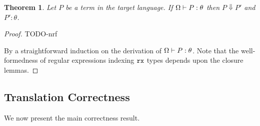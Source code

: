 \documentclass[10pt,preprint]{sigplanconf}
\newtheorem{thm}{Theorem}
\theoremstyle{definition}
\newcommand{\sreduces}{ \Downarrow }
\begin{document}
\begin{thm}
  Let $P$ be a term in the target language. If $\Omega \vdash P : \theta$ 
  then $P \sreduces P'$ and $P' : \theta$.
\end{thm}
\begin{proof}
TODO-nrf

  By a straightforward induction on the derivation of $\Omega \vdash P : \theta$.
Note that the well-formedness of regular expressions indexing ${\tt rx}$ types
depends upon the closure lemmas.
\end{proof}

\subsection{Translation Correctness}

We now present the main correctness result.
\end{document}
